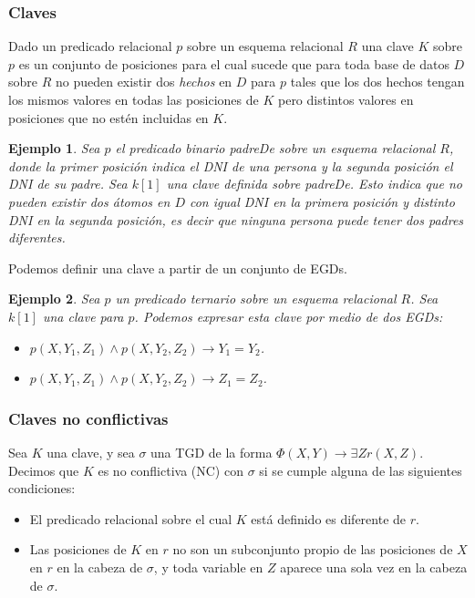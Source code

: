 \documentclass[11pt,a4paper,twoside]{tesis}
\newtheorem{exmp}{Ejemplo}
\begin{document}
\subsubsection{Claves}
Dado un predicado relacional $p$ sobre un esquema relacional $R$ una clave $K$ sobre $p$ es un conjunto de posiciones para el cual sucede que para toda base de datos $D$ sobre $R$ no pueden existir dos \textit{hechos} en $D$ para $p$ tales que los dos hechos tengan los mismos valores en todas las posiciones de $K$ pero distintos valores en posiciones que no estén incluidas en $K$. 

\begin{exmp}
Sea $p$ el predicado binario \textit{padreDe} sobre un esquema relacional $R$, donde la primer posición indica el DNI de una persona y la segunda posición el DNI de su padre. Sea $k[1]$ una clave definida sobre \textit{padreDe}. Esto indica que no pueden existir dos átomos en $D$ con igual DNI en la primera posición y distinto DNI en la segunda posición, es decir que ninguna persona puede tener dos padres diferentes.
\end{exmp}

Podemos definir una clave a partir de un conjunto de EGDs.
\begin{exmp}
Sea $p$ un predicado ternario sobre un esquema relacional $R$. Sea $k[1]$ una clave para $p$. Podemos expresar esta clave por medio de dos EGDs:
\begin{itemize}
    \item $p(X, Y_1, Z_1) \land p(X, Y_2, Z_2) \rightarrow Y_1 = Y_2$.
    \item $p(X, Y_1, Z_1) \land p(X, Y_2, Z_2) \rightarrow Z_1 = Z_2$.
\end{itemize}
\end{exmp}


\subsubsection{Claves no conflictivas}\label{claves_no_conflictivas}
Sea $K$ una clave, y sea $\sigma$ una TGD de la forma $\Phi(X, Y) \rightarrow \exists Z r(X, Z)$. Decimos que $K$ es no conflictiva (NC) con $\sigma$ si se cumple alguna de las siguientes condiciones:
\begin{itemize}
    \item El predicado relacional sobre el cual $K$ está definido es diferente de $r$.
    \item Las posiciones de $K$ en $r$ no son un subconjunto propio de las posiciones de $X$ en $r$ en la cabeza de $\sigma$, y toda variable en $Z$ aparece una sola vez en la cabeza de $\sigma$. 
\end{itemize}
\end{document}

